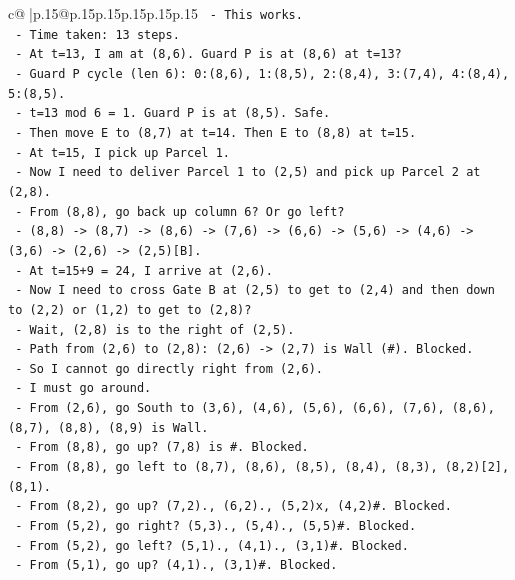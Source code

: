 \documentclass{article}
\begin{document}
{\begin{supertabular}{c@{$\;$}|p{.15\linewidth}@{}p{.15\linewidth}p{.15\linewidth}p{.15\linewidth}p{.15\linewidth}p{.15\linewidth}}
{{{\texttt{    {-} This works.} \\
\texttt{    {-} Time taken: 13 steps.} \\
\texttt{    {-} At t=13, I am at (8,6). Guard P is at (8,6) at t=13?} \\
\texttt{      {-} Guard P cycle (len 6): 0:(8,6), 1:(8,5), 2:(8,4), 3:(7,4), 4:(8,4), 5:(8,5).} \\
\texttt{      {-} t=13 mod 6 = 1. Guard P is at (8,5). Safe.} \\
\texttt{    {-} Then move E to (8,7) at t=14. Then E to (8,8) at t=15.} \\
\texttt{    {-} At t=15, I pick up Parcel 1.} \\
\texttt{    {-} Now I need to deliver Parcel 1 to (2,5) and pick up Parcel 2 at (2,8).} \\
\texttt{    {-} From (8,8), go back up column 6? Or go left?} \\
\texttt{    {-} (8,8) {-}> (8,7) {-}> (8,6) {-}> (7,6) {-}> (6,6) {-}> (5,6) {-}> (4,6) {-}> (3,6) {-}> (2,6) {-}> (2,5){[}B{]}.} \\
\texttt{    {-} At t=15+9 = 24, I arrive at (2,6).} \\
\texttt{    {-} Now I need to cross Gate B at (2,5) to get to (2,4) and then down to (2,2) or (1,2) to get to (2,8)?} \\
\texttt{    {-} Wait, (2,8) is to the right of (2,5).} \\
\texttt{    {-} Path from (2,6) to (2,8): (2,6) {-}> (2,7) is Wall (\#). Blocked.} \\
\texttt{    {-} So I cannot go directly right from (2,6).} \\
\texttt{    {-} I must go around.} \\
\texttt{    {-} From (2,6), go South to (3,6), (4,6), (5,6), (6,6), (7,6), (8,6), (8,7), (8,8), (8,9) is Wall.} \\
\texttt{    {-} From (8,8), go up? (7,8) is \#. Blocked.} \\
\texttt{    {-} From (8,8), go left to (8,7), (8,6), (8,5), (8,4), (8,3), (8,2){[}2{]}, (8,1).} \\
\texttt{    {-} From (8,2), go up? (7,2)., (6,2)., (5,2)x, (4,2)\#. Blocked.} \\
\texttt{    {-} From (5,2), go right? (5,3)., (5,4)., (5,5)\#. Blocked.} \\
\texttt{    {-} From (5,2), go left? (5,1)., (4,1)., (3,1)\#. Blocked.} \\
\texttt{    {-} From (5,1), go up? (4,1)., (3,1)\#. Blocked.} \\
}}}
\end{supertabular}}
\end{document}
